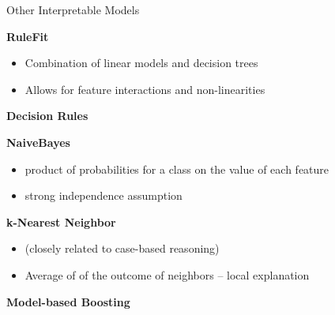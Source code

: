 \documentclass[11pt,compress,t,notes=noshow, aspectratio=169, xcolor=table]{beamer}
\begin{document}










\begin{frame}[c]{Other Interpretable Models}

\textbf{RuleFit} 
\begin{itemize}
    \item Combination of linear models and decision trees 
    \item Allows for feature interactions and non-linearities
\end{itemize}

\textbf{Decision Rules}

\textbf{NaiveBayes}
\begin{itemize}
    \item product of probabilities for a class on the value of each feature
    \item strong independence assumption
\end{itemize}


\textbf{k-Nearest Neighbor}
\begin{itemize}
    \item (closely related to case-based reasoning)
    \item Average of of the outcome of neighbors -- local explanation
\end{itemize}

\textbf{Model-based Boosting}

\end{frame}


\endlecture
\end{document}
